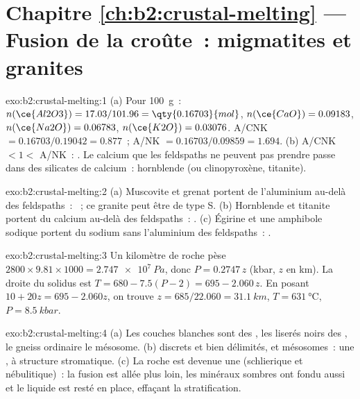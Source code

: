 \section*{Chapitre \ref{ch:b2:crustal-melting} --- Fusion de la croûte~: migmatites et granites}

\begin{solution}{exo:b2:crustal-melting:1}
(a) Pour \qty{100}{\gram}~: $n(\ce{Al2O3}) = 17.03/101.96 = \qty{0.16703}{mol}$,
$n(\ce{CaO}) = 0.09183$, $n(\ce{Na2O}) = 0.06783$, $n(\ce{K2O}) = 0.03076$.
A/CNK $= 0.16703/0.19042 = 0.877$~; A/NK $= 0.16703/0.09859 = 1.694$.
(b) A/CNK $< 1 <$ A/NK~: . Le calcium que les feldspaths ne peuvent pas
prendre passe dans des silicates de calcium~: hornblende (ou clinopyroxène, titanite).
\end{solution}

\begin{solution}{exo:b2:crustal-melting:2}
(a) Muscovite et grenat portent de l'aluminium au-delà des feldspaths~: ~; ce granite
peut être de type S. (b) Hornblende et titanite portent du calcium au-delà des feldspaths~:
. (c) Égirine et une amphibole sodique portent du sodium sans l'aluminium
des feldspaths~: .
\end{solution}

\begin{solution}{exo:b2:crustal-melting:3}
Un kilomètre de roche pèse $2800\times9.81\times1000 = \qty{2.747e7}{Pa}$, donc
$P = 0.2747\,z$ (\unit{kbar}, $z$ en \unit{km}). La droite du solidus est $T = 680 - 7.5(P -
2) = 695 - 2.060\,z$. En posant $10 + 20z = 695 - 2.060z$, on trouve $z = 685/22.060 =
\qty{31.1}{km}$, $T = \qty{631}{\celsius}$, $P = \qty{8.5}{kbar}$.
\end{solution}

\begin{solution}{exo:b2:crustal-melting:4}
(a) Les couches blanches sont des , les liserés noirs des , le gneiss ordinaire le
mésosome. (b)  discrets et bien délimités,  et mésosomes~: une ,
à structure stromatique. (c) La roche est devenue une  (schlierique et nébulitique)~:
la fusion est allée plus loin, les minéraux sombres ont fondu aussi et le liquide est resté en place,
effaçant la stratification.
\end{solution}

